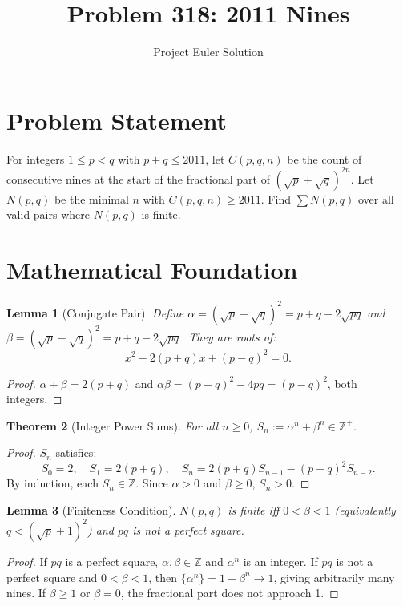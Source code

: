 \documentclass[12pt]{article}
\title{Problem 318: 2011 Nines}
\author{Project Euler Solution}
\date{}
\newtheorem{theorem}{Theorem}
\newtheorem{lemma}[theorem]{Lemma}
\begin{document}
\maketitle

\section{Problem Statement}

For integers $1 \le p < q$ with $p+q \le 2011$, let $C(p,q,n)$ be the count of consecutive nines at the start of the fractional part of $(\sqrt{p}+\sqrt{q})^{2n}$. Let $N(p,q)$ be the minimal $n$ with $C(p,q,n) \ge 2011$. Find $\sum N(p,q)$ over all valid pairs where $N(p,q)$ is finite.

\section{Mathematical Foundation}

\begin{lemma}[Conjugate Pair]
Define $\alpha = (\sqrt{p}+\sqrt{q})^2 = p+q+2\sqrt{pq}$ and $\beta = (\sqrt{p}-\sqrt{q})^2 = p+q-2\sqrt{pq}$. They are roots of:
\[
    x^2 - 2(p+q)x + (p-q)^2 = 0.
\]
\end{lemma}

\begin{proof}
$\alpha + \beta = 2(p+q)$ and $\alpha\beta = (p+q)^2 - 4pq = (p-q)^2$, both integers.
\end{proof}

\begin{theorem}[Integer Power Sums]
For all $n \ge 0$, $S_n := \alpha^n + \beta^n \in \mathbb{Z}^+$.
\end{theorem}

\begin{proof}
$S_n$ satisfies:
\[
    S_0 = 2,\quad S_1 = 2(p+q),\quad S_n = 2(p+q)S_{n-1} - (p-q)^2 S_{n-2}.
\]
By induction, each $S_n \in \mathbb{Z}$. Since $\alpha > 0$ and $\beta \ge 0$, $S_n > 0$.
\end{proof}

\begin{lemma}[Finiteness Condition]
$N(p,q)$ is finite iff $0 < \beta < 1$ (equivalently $q < (\sqrt{p}+1)^2$) and $pq$ is not a perfect square.
\end{lemma}

\begin{proof}
If $pq$ is a perfect square, $\alpha,\beta \in \mathbb{Z}$ and $\alpha^n$ is an integer. If $pq$ is not a perfect square and $0 < \beta < 1$, then $\{\alpha^n\} = 1 - \beta^n \to 1$, giving arbitrarily many nines. If $\beta \ge 1$ or $\beta = 0$, the fractional part does not approach 1.
\end{proof}
\end{document}
